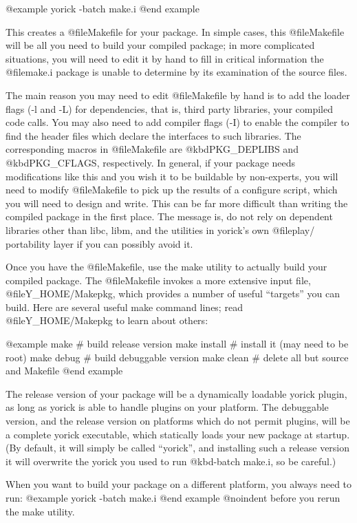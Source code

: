 @example
yorick -batch make.i
@end example

This creates a @file{Makefile} for your package.  In simple cases,
this @file{Makefile} will be all you need to build your compiled
package; in more complicated situations, you will need to edit it by
hand to fill in critical information the @file{make.i} package is
unable to determine by its examination of the source files.

The main reason you may need to edit @file{Makefile} by hand is to add
the loader flags (-l and -L) for dependencies, that is, third party
libraries, your compiled code calls.  You may also need to add
compiler flags (-I) to enable the compiler to find the header files
which declare the interfaces to such libraries.  The corresponding
macros in @file{Makefile} are @kbd{PKG_DEPLIBS} and @kbd{PKG_CFLAGS},
respectively.  In general, if your package needs modifications like
this and you wish it to be buildable by non-experts, you will need to
modify @file{Makefile} to pick up the results of a configure script,
which you will need to design and write.  This can be far more
difficult than writing the compiled package in the first place.  The
message is, do not rely on dependent libraries other than libc, libm,
and the utilities in yorick's own @file{play/} portability layer if
you can possibly avoid it.

Once you have the @file{Makefile}, use the make utility to actually
build your compiled package.  The @file{Makefile} invokes a more
extensive input file, @file{Y_HOME/Makepkg}, which provides a number
of useful ``targets'' you can build.  Here are several useful make
command lines; read @file{Y_HOME/Makepkg} to learn about others:

@example
make           # build release version
make install   # install it (may need to be root)
make debug     # build debuggable version
make clean     # delete all but source and Makefile
@end example

The release version of your package will be a dynamically loadable
yorick plugin, as long as yorick is able to handle plugins on your
platform.  The debuggable version, and the release version on
platforms which do not permit plugins, will be a complete yorick
executable, which statically loads your new package at startup.  (By
default, it will simply be called ``yorick'', and installing such a
release version it will overwrite the yorick you used to run
@kbd{-batch make.i}, so be careful.)

When you want to build your package on a different platform, you always
need to run:
@example
yorick -batch make.i
@end example
@noindent
before you rerun the make utility.

